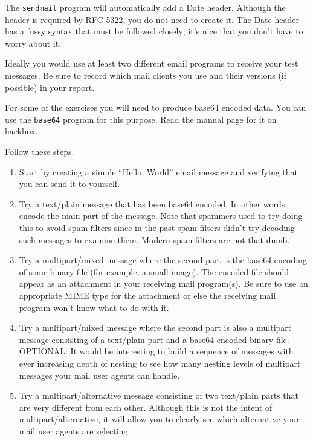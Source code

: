 \documentclass[twocolumn]{article}
\begin{document}
The \texttt{sendmail} program will automatically add a Date header. Although the header is
required by RFC-5322, you do not need to create it. The Date header has a fussy syntax that must
be followed closely; it's nice that you don't have to worry about it.

Ideally you would use at least two different email programs to receive your test messages. Be
sure to record which mail clients you use and their versions (if possible) in your report.

For some of the exercises you will need to produce base64 encoded data. You can use the
\texttt{base64} program for this purpose. Read the manual page for it on hackbox.

Follow these steps.

\begin{enumerate}

\item Start by creating a simple ``Hello, World'' email message and verifying that you can send
  it to yourself.

\item Try a text/plain message that has been base64 encoded. In other words, encode the main
  part of the message. Note that spammers used to try doing this to avoid spam filters since in
  the past spam filters didn't try decoding such messages to examine them. Modern spam filters
  are not that dumb.

\item Try a multipart/mixed message where the second part is the base64 encoding of some binary
  file (for example, a small image). The encoded file should appear as an attachment in your
  receiving mail program(s). Be sure to use an appropriate MIME type for the attachment or else
  the receiving mail program won't know what to do with it.

\item Try a multipart/mixed message where the second part is also a multipart message consisting
  of a text/plain part and a base64 encoded binary file. OPTIONAL: It would be interesting to
  build a sequence of messages with ever increasing depth of nesting to see how many nesting
  levels of multipart messages your mail user agents can handle.

\item Try a multipart/alternative message consisting of two text/plain parts that are very
  different from each other. Although this is not the intent of multipart/alternative, it will
  allow you to clearly see which alternative your mail user agents are selecting.


\end{enumerate}
\end{document}
